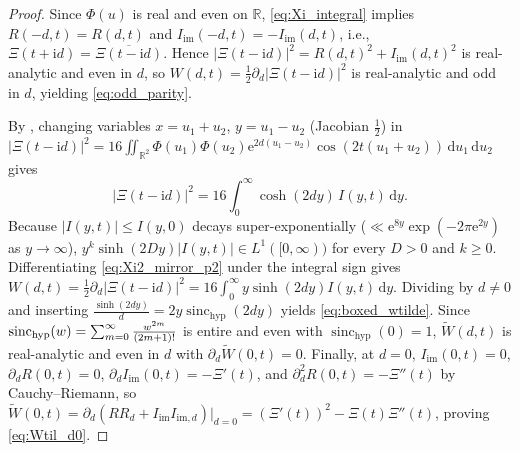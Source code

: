 \documentclass[11pt,a4paper,reqno]{amsart}
\theoremstyle{definition}
\theoremstyle{remark}
\numberwithin{equation}{section}
\newcommand{\dd}{\mathrm{d}}
\newcommand{\ii}{\mathrm{i}}
\newcommand{\ee}{\mathrm{e}}
\newcommand{\Wtil}{\widetilde{W}}
\newcommand{\sinch}{\operatorname{sinc}_{\mathrm{hyp}}}
\newcommand{\fac}{\mathclose{\mathchar"0021}}
\begin{document}
\begin{proof}
Since $\Phi(u)$ is real and even on $\mathbb{R}$, \eqref{eq:Xi_integral} implies $R(-d,t) = R(d,t)$ and $I_{\mathrm{im}}(-d,t) = -I_{\mathrm{im}}(d,t)$, i.e., $\Xi(t+\ii d) = \overline{\Xi(t-\ii d)}$. Hence $|\Xi(t-\ii d)|^2 = R(d,t)^2 + I_{\mathrm{im}}(d,t)^2$ is real-analytic and even in $d$, so $W(d,t) = \frac{1}{2}\partial_d|\Xi(t-\ii d)|^2$ is real-analytic and odd in $d$, yielding \eqref{eq:odd_parity}.

By \cite[Theorem~1.1(i)]{Missiaen2026Paper1}, changing variables $x = u_1 + u_2$, $y = u_1 - u_2$ (Jacobian $\frac{1}{2}$) in $|\Xi(t-\ii d)|^2 = 16\iint_{\mathbb{R}^2}\Phi(u_1)\Phi(u_2)\ee^{2d(u_1-u_2)}\cos(2t(u_1+u_2))\,\dd u_1\,\dd u_2$ gives
\begin{equation}\label{eq:Xi2_mirror_p2}
\big|\Xi(t-\ii d)\big|^2 = 16\int_0^\infty \cosh(2d y)\,I(y,t)\,\dd y.
\end{equation}
Because $|I(y,t)| \le I(y,0)$ decays super-exponentially ($\ll \ee^{8y}\exp(-2\pi\ee^{2y})$ as $y \to \infty$), $y^k\sinh(2D y)|I(y,t)| \in L^1([0,\infty))$ for every $D > 0$ and $k \ge 0$. Differentiating \eqref{eq:Xi2_mirror_p2} under the integral sign gives $W(d,t) = \frac{1}{2}\partial_d|\Xi(t-\ii d)|^2 = 16\int_0^\infty y\sinh(2d y)I(y,t)\,\dd y$. Dividing by $d \neq 0$ and inserting $\frac{\sinh(2d y)}{d} = 2y\sinch(2d y)$ yields \eqref{eq:boxed_wtilde}. Since $\sinch(w) = \sum_{m=0}^\infty \frac{w^{2m}}{(2m+1)\fac}$ is entire and even with $\sinch(0) = 1$, $\Wtil(d,t)$ is real-analytic and even in $d$ with $\partial_d\Wtil(0,t) = 0$. Finally, at $d = 0$, $I_{\mathrm{im}}(0,t) = 0$, $\partial_d R(0,t) = 0$, $\partial_d I_{\mathrm{im}}(0,t) = -\Xi'(t)$, and $\partial_d^2 R(0,t) = -\Xi''(t)$ by Cauchy--Riemann, so $\Wtil(0,t) = \partial_d(R R_d + I_{\mathrm{im}}I_{\mathrm{im},d})|_{d=0} = (\Xi'(t))^2 - \Xi(t)\Xi''(t)$, proving \eqref{eq:Wtil_d0}.
\end{proof}
\end{document}
